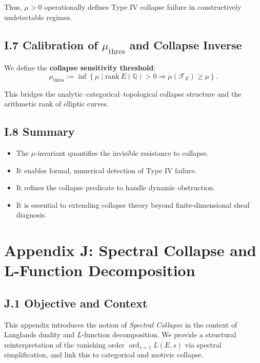\documentclass[11pt]{article}
\newcommand{\ord}{\operatorname{ord}}
\begin{document}
Thus, \(\mu > 0\) operationally defines Type IV collapse failure in constructively undetectable regimes.

\subsection*{I.7 Calibration of \(\mu_{\mathrm{thres}}\) and Collapse Inverse}

We define the \textbf{collapse sensitivity threshold}:
\[
\mu_{\mathrm{thres}} := \inf \left\{ \mu \mid \mathrm{rank}~E(\mathbb{Q}) > 0 \Rightarrow \mu(\mathcal{F}_E) \geq \mu \right\}.
\]

This bridges the analytic–categorical–topological collapse structure and the arithmetic rank of elliptic curves.

\subsection*{I.8 Summary}

\begin{itemize}
  \item The \(\mu\)-invariant quantifies the invisible resistance to collapse.
  \item It enables formal, numerical detection of Type IV failure.
  \item It refines the collapse predicate to handle dynamic obstruction.
  \item It is essential to extending collapse theory beyond finite-dimensional sheaf diagnosis.
\end{itemize}



\appendix
\section*{Appendix J: Spectral Collapse and L-Function Decomposition}

\subsection*{J.1 Objective and Context}

This appendix introduces the notion of \emph{Spectral Collapse} in the context of Langlands duality and \( L \)-function decomposition. We provide a structural reinterpretation of the vanishing order \( \ord_{s=1} L(E,s) \) via spectral simplification, and link this to categorical and motivic collapse.
\end{document}

